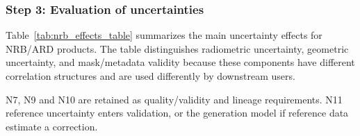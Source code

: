 \subsubsection{Step 3: Evaluation of uncertainties}

Table~\ref{tab:nrb_effects_table} summarizes the main uncertainty effects for
\ac{NRB}/\ac{ARD} products. The table distinguishes radiometric uncertainty, geometric
uncertainty, and mask/metadata validity because these components have different
correlation structures and are used differently by downstream users.




N7, N9 and N10 are retained as quality/validity and lineage requirements. N11 reference uncertainty enters validation, or the generation model if reference data estimate a correction.

